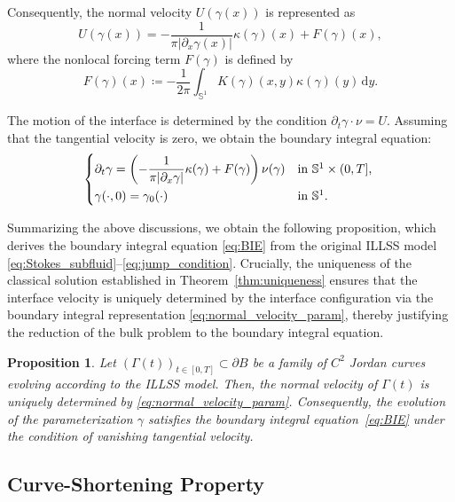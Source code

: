\documentclass{article}
\newtheorem{proposition}[theorem]{Proposition}
\theoremstyle{remark}
\theoremstyle{definition}
\numberwithin{equation}{section}
\begin{document}
Consequently, the normal velocity $U(\gamma(x))$ is represented as
\begin{equation}
    U(\gamma(x)) = -\frac{1}{\pi |\partial_x \gamma(x)|} \kappa(\gamma)(x) + F(\gamma)(x),
    \label{eq:normal_velocity_param}
\end{equation}
where the nonlocal forcing term $F(\gamma)$ is defined by
\begin{equation}
    F(\gamma)(x) \coloneqq -\frac{1}{2\pi} \int_{\mathbb{S}^1} K(\gamma)(x, y) \kappa(\gamma)(y) \, \mathrm{d}y.
\end{equation}

The motion of the interface is determined by the condition $\partial_t \gamma \cdot \nu = U$. Assuming that the tangential velocity is zero, we obtain the boundary integral equation:
\begin{equation}
    \begin{dcases*}
        \partial_t \gamma = \left( -\frac{1}{\pi |\partial_x \gamma|} \kappa(\gamma) + F(\gamma) \right) \nu(\gamma) & in $\mathbb{S}^1 \times (0, T]$, \\
        \gamma(\cdot, 0) = \gamma_0(\cdot) & in $\mathbb{S}^1$.
    \end{dcases*}
    \label{eq:BIE}
\end{equation}

Summarizing the above discussions, we obtain the following proposition, which derives the boundary integral equation \eqref{eq:BIE} from the original ILLSS model \eqref{eq:Stokes_subfluid}--\eqref{eq:jump_condition}.
Crucially, the uniqueness of the classical solution established in Theorem~\ref{thm:uniqueness} ensures that the interface velocity is uniquely determined by the interface configuration via the boundary integral representation \eqref{eq:normal_velocity_param}, thereby justifying the reduction of the bulk problem to the boundary integral equation.

\begin{proposition}
\label{prop:BIE_derivation}
Let $(\Gamma(t))_{t \in [0, T]} \subset \partial B$ be a family of $C^2$ Jordan curves evolving according to the ILLSS model.
Then, the normal velocity of $\Gamma(t)$ is uniquely determined by \eqref{eq:normal_velocity_param}.
Consequently, the evolution of the parameterization $\gamma$ satisfies the boundary integral equation~\eqref{eq:BIE} under the condition of vanishing tangential velocity.
\end{proposition}


\subsection{Curve-Shortening Property}
\label{subsubsec:CS}
\end{document}
